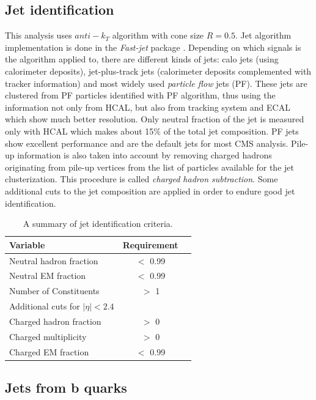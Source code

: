\subsection{Jet identification}
\label{sec:jetID}
This analysis uses $anti-k_T$ algorithm with cone size $R=0.5$. Jet algorithm implementation is done in the \textit{Fast-jet} package \cite{Cacciari:2011ma}. Depending on which signals is the algorithm applied to, there are different kinds of jets: calo jets (using calorimeter deposits), jet-plus-track jets (calorimeter deposits complemented with tracker information) and most widely used \textit{particle flow} jets (PF). These jets are clustered from PF particles identified with PF algorithm, thus using the information not only from HCAL, but also from tracking system and ECAL which show much better resolution. Only neutral fraction of the jet is measured only with HCAL which makes about 15$\%$ of the total jet composition. PF jets show excellent performance and are the default jets for most CMS analysis. Pile-up information is also taken into account by removing charged hadrons originating from pile-up vertices from the list of particles available for the jet clusterization. This procedure is called \textit{charged hadron subtraction}. Some additional cuts to the jet composition are applied in order to endure good jet identification.  
  \begin{table}[h]
\centering
  \caption{A summary of jet identification criteria.}
  \label{tab:jetID}
  \begin{tabular}{ l  c c}
      \hline
      \hline
      	Variable & Requirement \\
      	\hline
    		Neutral hadron fraction & $<$ 0.99  \\
     	Neutral EM fraction & $<$ 0.99 \\
     	Number of Constituents & $>$ 1 \\		
		\hline
		Additional cuts for $|\eta|<2.4$ \\
		\hline
		Charged hadron fraction & $>$ 0 \\ 
		Charged multiplicity & $>$ 0 \\
		Charged EM fraction & $<$ 0.99 \\
      \hline
      \hline 
  \end{tabular}
\end{table}


\subsection{Jets from b quarks}
\label{sec:btagging}

